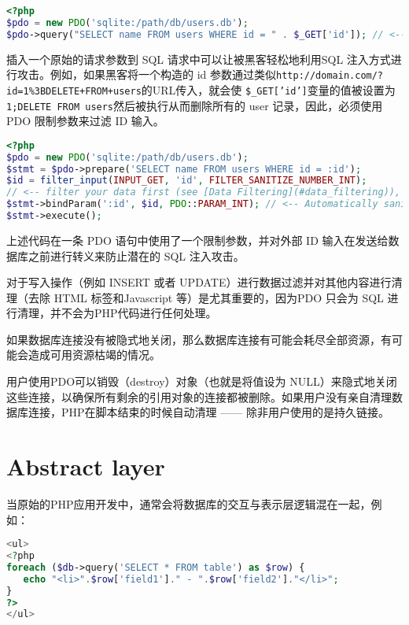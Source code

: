 \begin{lstlisting}[language=PHP]
<?php
$pdo = new PDO('sqlite:/path/db/users.db');
$pdo->query("SELECT name FROM users WHERE id = " . $_GET['id']); // <-- NO!
\end{lstlisting}

插入一个原始的请求参数到 SQL 请求中可以让被黑客轻松地利用SQL 注入方式进行攻击。例如，如果黑客将一个构造的 id 参数通过类似\texttt{http://domain.com/?id=1\%3BDELETE+FROM+users}的URL传入，就会使 \texttt{\$\_GET['id']}变量的值被设置为\texttt{1;DELETE FROM users}然后被执行从而删除所有的 user 记录，因此，必须使用 PDO 限制参数来过滤 ID 输入。

\begin{lstlisting}[language=PHP]
<?php
$pdo = new PDO('sqlite:/path/db/users.db');
$stmt = $pdo->prepare('SELECT name FROM users WHERE id = :id');
$id = filter_input(INPUT_GET, 'id', FILTER_SANITIZE_NUMBER_INT); 
// <-- filter your data first (see [Data Filtering](#data_filtering)), especially important for INSERT, UPDATE, etc.
$stmt->bindParam(':id', $id, PDO::PARAM_INT); // <-- Automatically sanitized for SQL by PDO
$stmt->execute();
\end{lstlisting}

上述代码在一条 PDO 语句中使用了一个限制参数，并对外部 ID 输入在发送给数据库之前进行转义来防止潜在的 SQL 注入攻击。

对于写入操作（例如 INSERT 或者 UPDATE）进行数据过滤并对其他内容进行清理（去除 HTML 标签和Javascript 等）是尤其重要的，因为PDO 只会为 SQL 进行清理，并不会为PHP代码进行任何处理。

如果数据库连接没有被隐式地关闭，那么数据库连接有可能会耗尽全部资源，有可能会造成可用资源枯竭的情况。

用户使用PDO可以销毁（destroy）对象（也就是将值设为 NULL）来隐式地关闭这些连接，以确保所有剩余的引用对象的连接都被删除。如果用户没有亲自清理数据库连接，PHP在脚本结束的时候自动清理 —— 除非用户使用的是持久链接。

\section{Abstract layer}

当原始的PHP应用开发中，通常会将数据库的交互与表示层逻辑混在一起，例如：

\begin{lstlisting}[language=PHP]
<ul>
<?php 
foreach ($db->query('SELECT * FROM table') as $row) {
   echo "<li>".$row['field1']." - ".$row['field2']."</li>";
}
?>
</ul>
\end{lstlisting}

